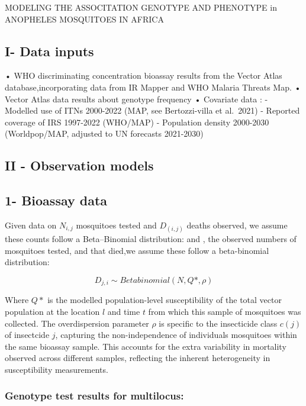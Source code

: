 \documentclass[
]{article}
\author{}
\date{\vspace{-2.5em}}
\begin{document}
MODELING THE ASSOCITATION GENOTYPE AND PHENOTYPE in ANOPHELES MOSQUITOES
IN AFRICA

\subsection{I- Data inputs}\label{i--data-inputs}

• WHO discriminating concentration bioassay results from the Vector
Atlas database,incorporating data from IR Mapper and WHO Malaria Threats
Map. • Vector Atlas data results about genotype frequency • Covariate
data : - Modelled use of ITNs 2000-2022 (MAP, see Bertozzi-villa et
al.~2021) - Reported coverage of IRS 1997-2022 (WHO/MAP) - Population
density 2000-2030 (Worldpop/MAP, adjusted to UN forecasts 2021-2030)

\subsection{II - Observation models}\label{ii---observation-models}

\subsection{1- Bioassay data}\label{bioassay-data}

Given data on \(N_{i,j}\) mosquitoes tested and \(D_(i,j)\) deaths
observed, we assume these counts follow a Beta--Binomial distribution:
and , the observed numbers of mosquitoes tested, and that died,we assume
these follow a beta-binomial distribution:

\[
D_{j,i} \sim Betabinomial(N, Q*, \rho)
\]

Where \(Q*\) is the modelled population-level susceptibility of the
total vector population at the location \(l\) and time \(t\) from which
this sample of mosquitoes was collected. The overdispersion parameter
\(\rho\) is specific to the insecticide class \(c(j)\) of insectcide
\(j\), capturing the non-independence of individuals mosquitoes within
the same bioassay sample. This accounts for the extra variability in
mortality observed across different samples, reflecting the inherent
heterogeneity in susceptibility measurements.

\subsubsection{Genotype test results for
multilocus:}\label{genotype-test-results-for-multilocus}
\end{document}
